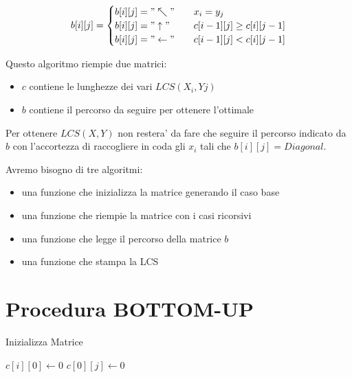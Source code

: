 \[
    b[i][j] =
    \begin{cases} 
        \text{$b[i][j] = "\nwarrow"$} & \quad \text{$x_{i} = y_{j}$} \\
        \text{$b[i][j] = "\uparrow"$} & \quad \text{$c[i-1][j] \geq c[i][j-1]$} \\
        \text{$b[i][j] = "\leftarrow"$} & \quad \text{$c[i-1][j] < c[i][j-1]$}
    \end{cases}
\]

Questo algoritmo riempie due matrici:
\begin{itemize}
    \item $c$ contiene le lunghezze dei vari $LCS(X_{i}, Y{j})$
    \item $b$ contiene il percorso da seguire per ottenere l'ottimale
\end{itemize}

Per ottenere $LCS(X, Y)$ non restera' da fare che seguire il percorso indicato da $b$ con l'accortezza di raccogliere in coda gli $x_{i}$ tali che $b[i][j] = Diagonal$.

Avremo bisogno di tre algoritmi:
\begin{itemize}
    \item una funzione che inizializza la matrice generando il caso base
    \item una funzione che riempie la matrice con i casi ricorsivi
    \item una funzione che legge il percorso della matrice $b$
    \item una funzione che stampa la LCS
\end{itemize}

\newpage

\section{Procedura BOTTOM-UP}

\begin{algorithm}
    \renewcommand\thealgorithm{}
    \caption{Inizializza Matrice}
    \begin{algorithmic}
                \State $c[i][0] \gets 0$
            \EndFor
                \State $c[0][j] \gets 0$
            \EndFor
        \EndProcedure
    \end{algorithmic}
\end{algorithm}

